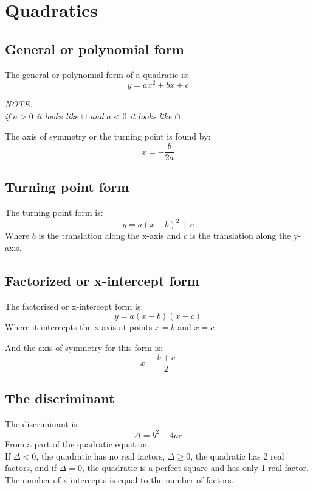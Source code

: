 \documentclass{book}
\newenvironment{note}{\begin{center}\em NOTE:\\}{\end{center}}
\begin{document}
\chapter{Quadratics}
\section{General or polynomial form}
The general or polynomial form of a quadratic is:
\[
	y = ax^2 + bx + c
\]
\begin{note}
	if $a > 0$ it looks like $\cup$ and $a < 0$ it looks like $\cap$
\end{note}
The axis of symmetry or the turning point is found by:
\[
	x = -\frac{b}{2a}
\]

\section{Turning point form}
The turning point form is:
\[
	y = a(x - b)^2 + c
\]
Where $b$ is the translation along the x-axis and $c$ is the translation along the y-axis.

\section{Factorized or x-intercept form}
The factorized or x-intercept form is:
\[
	y = a(x - b)(x - c)
\]
Where it intercepts the x-axis at points $x = b$ and $x = c$

And the axis of symmetry for this form is:
\[
	x = \frac{b + c}{2}
\]

\section{The discriminant}
The discriminant is:
\[
	\Delta = b^2 - 4ac
\]
From a part of the quadratic equation.\\
If $\Delta < 0$, the quadratic has no real factors, $\Delta \geq 0$, the quadratic has 2 real factors, and if $\Delta = 0$, the quadratic is a perfect square and has only 1 real factor.  The number of x-intercepts is equal to the number of factors.
\end{document}
